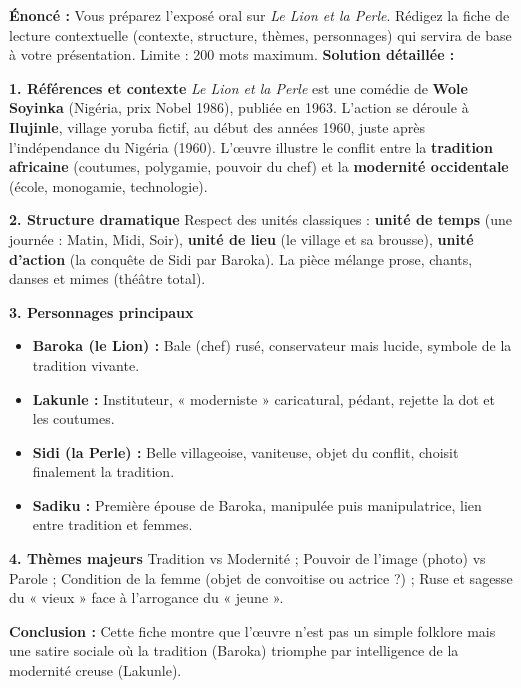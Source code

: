 \documentclass[11pt]{article}
\begin{document}
\begin{exoresolu}
    \textbf{Énoncé :} Vous préparez l'exposé oral sur \emph{Le Lion et la Perle}. Rédigez la fiche de lecture contextuelle (contexte, structure, thèmes, personnages) qui servira de base à votre présentation. Limite : 200 mots maximum.
    \tcblower
    \textbf{Solution détaillée :}
    
    \textbf{1. Références et contexte}
    \emph{Le Lion et la Perle} est une comédie de \textbf{Wole Soyinka} (Nigéria, prix Nobel 1986), publiée en 1963. L'action se déroule à \textbf{Ilujinle}, village yoruba fictif, au début des années 1960, juste après l'indépendance du Nigéria (1960). L'œuvre illustre le conflit entre la \textbf{tradition africaine} (coutumes, polygamie, pouvoir du chef) et la \textbf{modernité occidentale} (école, monogamie, technologie).
    
    \textbf{2. Structure dramatique}
    Respect des unités classiques : \textbf{unité de temps} (une journée : Matin, Midi, Soir), \textbf{unité de lieu} (le village et sa brousse), \textbf{unité d'action} (la conquête de Sidi par Baroka). La pièce mélange prose, chants, danses et mimes (théâtre total).
    
    \textbf{3. Personnages principaux}
    \begin{itemize}
        \item \textbf{Baroka (le Lion) :} Bale (chef) rusé, conservateur mais lucide, symbole de la tradition vivante.
        \item \textbf{Lakunle :} Instituteur, « moderniste » caricatural, pédant, rejette la dot et les coutumes.
        \item \textbf{Sidi (la Perle) :} Belle villageoise, vaniteuse, objet du conflit, choisit finalement la tradition.
        \item \textbf{Sadiku :} Première épouse de Baroka, manipulée puis manipulatrice, lien entre tradition et femmes.
    \end{itemize}
    
    \textbf{4. Thèmes majeurs}
    Tradition vs Modernité ; Pouvoir de l'image (photo) vs Parole ; Condition de la femme (objet de convoitise ou actrice ?) ; Ruse et sagesse du « vieux » face à l'arrogance du « jeune ».
    
    \textbf{Conclusion :} Cette fiche montre que l'œuvre n'est pas un simple folklore mais une satire sociale où la tradition (Baroka) triomphe par intelligence de la modernité creuse (Lakunle).
\end{exoresolu}
\end{document}
